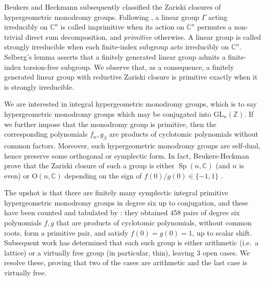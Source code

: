 \documentclass[11pt]{article}
\DeclareMathOperator{\Sp}{Sp}
\newcommand{\ZZ}{\mathbb{Z}}
\newcommand{\CC}{\mathbb{C}}
\begin{document}
Beukers and Heckmann subsequently classified the Zariski closures of hypergeometric monodromy groups. 
Following \cite[Definition 5.1]{BeukersHeckman1989hypergeometric}, a linear group $\Gamma$ acting irreducibly on $\mathbb{C}^n$ is called imprimitive when its action on $\mathbb{C}^n$ permutes a non-trivial direct sum decomposition, and \emph{primitive} otherwise. 
A linear group is called strongly irreducible when each finite-index subgroup acts irreducibly on $\mathbb{C}^n$. 
Selberg's lemma asserts that a finitely generated linear group admits a finite-index torsion-free subgroup.
We observe that, as a consequence, a finitely generated linear group with reductive Zariski closure is primitive exactly when it is strongly irreducible. %

We are interested in integral hypergeometric monodromy groups, which is to say hypergeometric monodromy groups which may be conjugated into $\mathrm{GL}_n(\ZZ)$. 
If we further impose that the monodromy group is primitive, then the corresponding polynomials $f_\alpha,g_\beta$ are products of cyclotomic polynomials without common factors. %
Moreover, such hypergeometric monodromy groups are self-dual, hence preserve some orthogonal or symplectic form. 
In fact, Beukers-Heckman prove that the Zariski closure of such a group is either $\Sp(n,\CC)$ (and $n$ is even) or $\mathrm{O}(n,\CC)$ depending on the sign of $f(0)/g(0) \in \{-1,1\}$ \cite{BeukersHeckman1989hypergeometric}. 

The upshot is that there are finitely many symplectic integral primitive hypergeometric monodromy groups in degree six up to conjugation, and these have been counted and tabulated by \cite{BajpaiDonaSinghSingh2021degreesix}: they obtained 458 pairs of degree six polynomials $f,g$ that are products of cyclotomic polynomials, without common roots, form a primitive pair, and satisfy $f(0)=g(0)=1$, up to scalar shift. 
Subsequent work has determined that each such group is either arithmetic (i.e.\ a lattice) or a virtually free group (in particular, thin), leaving 3 open cases. 
We resolve these, proving that two of the cases are arithmetic and the last case is virtually free. 
\end{document}
